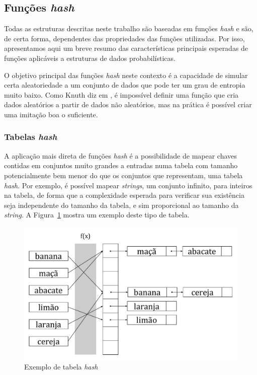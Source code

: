 \subsection{Funções \emph{hash}}

Todas as estruturas descritas neste trabalho são baseadas em funções \emph{hash} e são, de certa forma, dependentes das propriedades das funções utilizadas. Por isso, apresentamos aqui um breve resumo das características principais esperadas de funções aplicáveis a estruturas de dados probabilísticas.

O objetivo principal das funções \emph{hash} neste contexto é a capacidade de simular certa aleatoriedade a um conjunto de dados que pode ter um grau de entropia muito baixo. Como Knuth diz em \cite{knuth1998art}, é impossível definir uma função que cria dados aleatórios a partir de dados não aleatórios, mas na prática é possível criar uma imitação boa o suficiente.

\subsubsection{Tabelas \emph{hash}}

A aplicação mais direta de funções \emph{hash} é a possibilidade de mapear chaves contidas em conjuntos muito grandes a entradas numa tabela com tamanho potencialmente bem menor do que os conjuntos que representam, uma tabela \emph{hash}. Por exemplo, é possível mapear \emph{strings}, um conjunto infinito, para inteiros na tabela, de forma que a complexidade esperada para verificar sua existência seja independente do tamanho da tabela, e sim proporcional ao tamanho da \emph{string}. A Figura~\ref{fig:hashtable} mostra um exemplo deste tipo de tabela.

\begin{figure}[!htbp]
  \centering
  \includegraphics[scale=0.6]{files/hashtable.pdf}
  \caption{Exemplo de tabela \emph{hash}}
  \label{fig:hashtable}
\end{figure}

